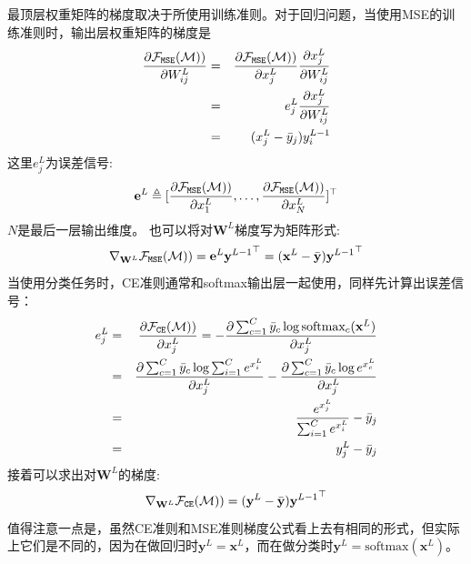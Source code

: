 最顶层权重矩阵的梯度取决于所使用训练准则。对于回归问题，当使用MSE的训练准则时，输出层权重矩阵的梯度是
\begin{eqnarray}
    \frac{\partial \mathcal{F}_{\tt MSE}(\mathcal{M}))}{\partial W^L_{ij}} &=& \frac{\partial \mathcal{F}_{\tt MSE}(\mathcal{M}))}{\partial x^L_j} \frac{\partial x^L_j}{\partial W^L_{ij}} \\
    &=& e^L_j \frac{\partial x^L_j}{\partial W^L_{ij}} \\
    &=& (x^L_j - \bar{y}_j) y^{L-1}_i
\end{eqnarray}
这里$e^L_j$为误差信号:
\begin{equation}
    \mathbf{e}^L \triangleq [ \frac{\partial \mathcal{F}_{\tt MSE}(\mathcal{M}))}{\partial x^L_1}, \dots, \frac{\partial \mathcal{F}_{\tt MSE}(\mathcal{M}))}{\partial x^L_N} ]^{\top}
\end{equation}
$N$是最后一层输出维度。
也可以将对$\mathbf{W}^L$梯度写为矩阵形式:
\begin{equation}
   \nabla_{\mathbf{W}^L} \mathcal{F}_{\tt MSE}(\mathcal{M})) = \mathbf{e}^L {\mathbf{y}^{L-1}}^{\top} = (\mathbf{x}^L - \bar{\mathbf{y}}) {\mathbf{y}^{L-1}}^{\top}
\end{equation}
当使用分类任务时，CE准则通常和softmax输出层一起使用，同样先计算出误差信号：
\begin{eqnarray}
    e^L_j &=& \frac{\partial \mathcal{F}_{\tt CE}(\mathcal{M}))}{\partial x^L_j} = - \frac{\partial \sum_{c=1}^C \bar{y}_c \log \text{softmax}_c(\mathbf{x}^L) }{\partial x^L_j} \\
    &=& \frac{\partial \sum_{c=1}^C \bar{y}_c \log \sum_{i=1}^C e^{x^L_i} }{\partial x^L_j} - \frac{\partial \sum_{c=1}^C \bar{y}_c \log e^{x^L_c} }{\partial x^L_j} \\
    &=& \frac{e^{x^L_j}}{\sum_{i=1}^C e^{x^L_i}} - \bar{y}_j \\
    &=& y^L_j-\bar{y}_j
\end{eqnarray}
接着可以求出对$\mathbf{W}^L$的梯度:
\begin{equation}
    \nabla_{\mathbf{W}^L} \mathcal{F}_{\tt CE}(\mathcal{M})) = (\mathbf{y}^L - \bar{\mathbf{y}}) {\mathbf{y}^{L-1}}^{\top}
\end{equation}
值得注意一点是，虽然CE准则和MSE准则梯度公式看上去有相同的形式，但实际上它们是不同的，因为在做回归时$\mathbf{y}^L=\mathbf{x}^L$，而在做分类时$\mathbf{y}^L=\text{softmax}(\mathbf{x}^L)$。

